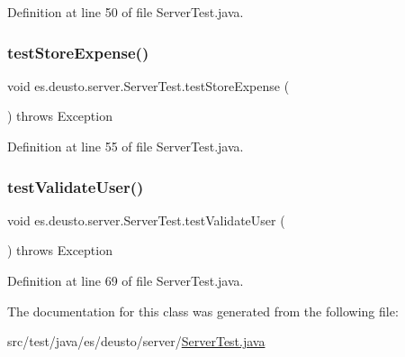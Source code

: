 Definition at line 50 of file Server\+Test.\+java.

\mbox{\label{classes_1_1deusto_1_1server_1_1_server_test_a7406203a7ff08400597008ca722f6205}} 
\subsubsection{\texorpdfstring{test\+Store\+Expense()}{testStoreExpense()}}
{\footnotesize\ttfamily void es.\+deusto.\+server.\+Server\+Test.\+test\+Store\+Expense (\begin{DoxyParamCaption}{ }\end{DoxyParamCaption}) throws Exception}



Definition at line 55 of file Server\+Test.\+java.

\mbox{\label{classes_1_1deusto_1_1server_1_1_server_test_af493f29fde42af9e7d4c065f49bf8502}} 
\subsubsection{\texorpdfstring{test\+Validate\+User()}{testValidateUser()}}
{\footnotesize\ttfamily void es.\+deusto.\+server.\+Server\+Test.\+test\+Validate\+User (\begin{DoxyParamCaption}{ }\end{DoxyParamCaption}) throws Exception}



Definition at line 69 of file Server\+Test.\+java.



The documentation for this class was generated from the following file\+:\begin{DoxyCompactItemize}
\item 
src/test/java/es/deusto/server/\hyperlink{_server_test_8java}{Server\+Test.\+java}\end{DoxyCompactItemize}
